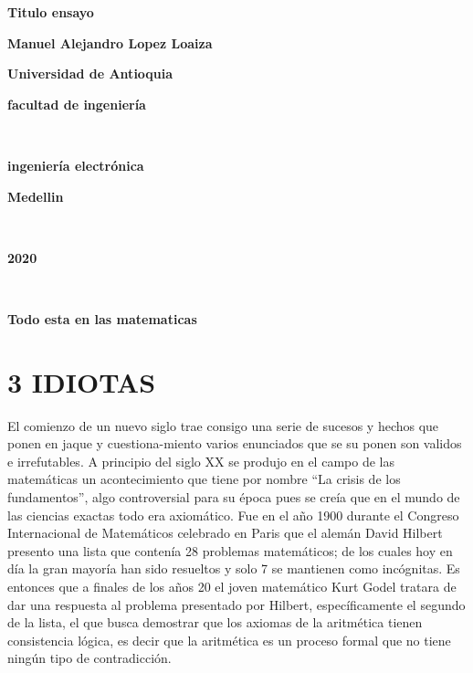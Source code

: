 \documentclass[12pt]{article}
\begin{document}
\begin{center}
\bf{\sc\Huge Titulo ensayo}\\
\end{center}
\vspace{120pt}
\begin{center}
\bf{\sc\Huge Manuel Alejandro Lopez Loaiza }\\
\end{center}
\vspace{200pt}
\begin{center}
\bf{\sc\Huge Universidad de Antioquia}
\end{center}
\begin{center}
\bf{\sc\Huge facultad de ingeniería}\\
\end{center}\
\begin{center}
\bf{\sc\Huge ingeniería electrónica}
\end{center}
\begin{center}
\bf{\sc\Huge Medellin}\\
\end{center}\
\begin{center}
\bf{\sc\Huge 2020}\\
\end{center}\



\newpage



\begin{center}

\bf{\sc\Huge Todo esta en las matematicas }\\
\end{center}
\vspace{25PT}
\section{ 3 IDIOTAS}
\large
El comienzo de un nuevo siglo trae consigo una serie de sucesos y hechos que ponen en jaque y cuestiona-miento varios enunciados que se su ponen son validos e irrefutables. A principio del siglo XX se produjo en el campo de las matemáticas un acontecimiento que tiene por nombre “La crisis de los fundamentos”, algo controversial para su época pues se creía que en el mundo de las ciencias exactas todo era axiomático.
Fue en el año 1900 durante el Congreso Internacional de Matemáticos celebrado en Paris que el alemán David Hilbert presento una lista que contenía 28 problemas matemáticos; de los cuales hoy en día la gran mayoría han sido resueltos y solo 7 se mantienen como incógnitas. Es entonces que a finales de los años 20 el joven matemático Kurt Godel tratara de dar una respuesta al problema presentado por Hilbert, específicamente el segundo de la lista, el que busca demostrar que los axiomas de la aritmética tienen consistencia lógica, es decir que la aritmética es un proceso formal que no tiene ningún tipo de contradicción.
\end{document}
